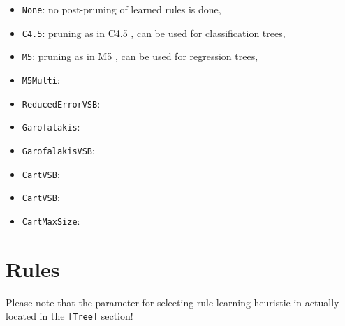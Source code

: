 \documentclass[a4paper]{report}
\begin{document}
\begin{itemize}
\begin{itemize}
		\item \texttt{None}: no post-pruning of learned rules is done,
		\item \texttt{C4.5}: pruning as in C4.5 \cite{Quinlan1993}, can be used for classification trees,
		\item \texttt{M5}: pruning as in M5 \cite{Quinlan1992},	can be used for regression trees,
		\item \texttt{M5Multi}: 			
		\item \texttt{ReducedErrorVSB}: 
		\item \texttt{Garofalakis}: 
		\item \texttt{GarofalakisVSB}: 
		\item \texttt{CartVSB}: 
		\item \texttt{CartVSB}: 
		\item \texttt{CartMaxSize}: 
	\end{itemize}
\end{itemize}

\section{Rules}

Please note that the parameter for selecting rule learning heuristic in actually located in the \texttt{[Tree]} section!
\end{document}
